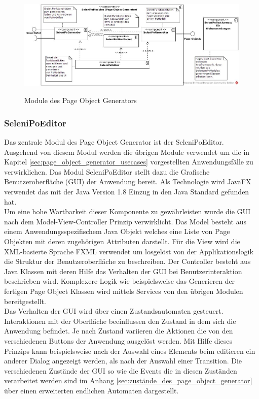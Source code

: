 \begin{figure}[htb]
  \centering  
  \includegraphics[scale=0.46]{img/ComponentDiagram.jpg}\\
  \caption{Module des Page Object Generators}
  \label{fig:component_diagramm}
\end{figure}

\subsubsection{SeleniPoEditor}
\label{sec:selenipoeditor}

Das zentrale Modul des Page Object Generator ist der SeleniPoEditor.
Ausgehend von diesem Modul werden die übrigen Module verwendet um die in Kapitel \ref{sec:page_object_generator_usecases} vorgestellten Anwendungsfälle zu verwirklichen.
Das Modul SeleniPoEditor stellt dazu die Grafische Benutzeroberfläche (GUI) der Anwendung bereit.
Als Technologie wird JavaFX \cite{oracle_client_2015} verwendet das mit der Java Version 1.8 Einzug in den Java Standard gefunden hat. \\
Um eine hohe Wartbarkeit dieser Komponente zu gewährleisten wurde die GUI nach dem Model-View-Controller Prinzip verwirklicht.
Das Model besteht aus einem Anwendungsspezifischem Java Objekt welches eine Liste von Page Objekten mit deren zugehörigen Attributen darstellt.
Für die View wird die XML-basierte Sprache FXML verwendet um losgelöst von der Applikationslogik die Struktur der Benutzeroberfläche zu beschreiben.
Der Controller besteht aus Java Klassen mit deren Hilfe das Verhalten der GUI bei Benutzerinteraktion beschrieben wird.
Komplexere Logik wie beispielsweise das Generieren der fertigen Page Object Klassen wird mittels Services von den übrigen Modulen bereitgestellt.\\
Das Verhalten der GUI wird über einen Zustandsautomaten gesteuert.
Interaktionen mit der Oberfläche beeinflussen den Zustand in dem sich die Anwendung befindet. Je nach Zustand variieren die Aktionen die von den verschiedenen Buttons der Anwendung ausgelöst werden.
Mit Hilfe dieses Prinzips kann beispielsweise nach der Auswahl eines Elements beim editieren ein anderer Dialog angezeigt werden, als nach der Auswahl einer Transition.
Die verschiedenen Zustände der GUI so wie die Events die in diesen Zuständen verarbeitet werden sind im Anhang \ref{sec:zustände_des_page_object_generator} über einen erweiterten endlichen Automaten dargestellt.

